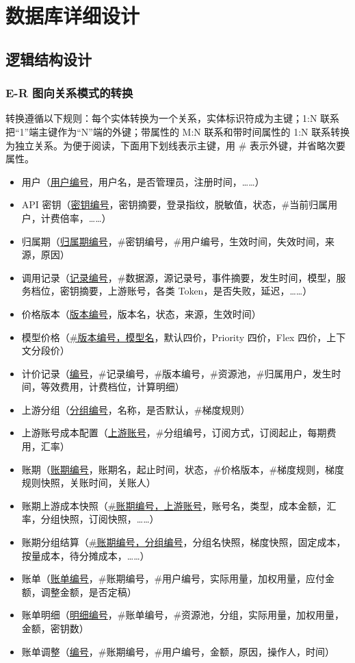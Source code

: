\section{数据库详细设计}

\subsection{逻辑结构设计}

\subsubsection{E-R 图向关系模式的转换}

转换遵循以下规则：每个实体转换为一个关系，实体标识符成为主键；1:N 联系把“1”端主键作为“N”端的外键；带属性的 M:N 联系和带时间属性的 1:N 联系转换为独立关系。为便于阅读，下面用下划线表示主键，用 \# 表示外键，并省略次要属性。

\begin{itemize}
  \item 用户（\underline{用户编号}，用户名，是否管理员，注册时间，……）
  \item API 密钥（\underline{密钥编号}，密钥摘要，登录指纹，脱敏值，状态，\#当前归属用户，计费倍率，……）
  \item 归属期（\underline{归属期编号}，\#密钥编号，\#用户编号，生效时间，失效时间，来源，原因）
  \item 调用记录（\underline{记录编号}，\#数据源，源记录号，事件摘要，发生时间，模型，服务档位，密钥摘要，上游账号，各类 Token，是否失败，延迟，……）
  \item 价格版本（\underline{版本编号}，版本名，状态，来源，生效时间）
  \item 模型价格（\underline{\#版本编号，模型名}，默认四价，Priority 四价，Flex 四价，上下文分段价）
  \item 计价记录（\underline{编号}，\#记录编号，\#版本编号，\#资源池，\#归属用户，发生时间，等效费用，计费档位，计算明细）
  \item 上游分组（\underline{分组编号}，名称，是否默认，\#梯度规则）
  \item 上游账号成本配置（\underline{上游账号}，\#分组编号，订阅方式，订阅起止，每期费用，汇率）
  \item 账期（\underline{账期编号}，账期名，起止时间，状态，\#价格版本，\#梯度规则，梯度规则快照，关账时间，关账人）
  \item 账期上游成本快照（\underline{\#账期编号，上游账号}，账号名，类型，成本金额，汇率，分组快照，订阅快照，……）
  \item 账期分组结算（\underline{\#账期编号，分组编号}，分组名快照，梯度快照，固定成本，按量成本，待分摊成本，……）
  \item 账单（\underline{账单编号}，\#账期编号，\#用户编号，实际用量，加权用量，应付金额，调整金额，是否定稿）
  \item 账单明细（\underline{明细编号}，\#账单编号，\#资源池，分组，实际用量，加权用量，金额，密钥数）
  \item 账单调整（\underline{编号}，\#账期编号，\#用户编号，金额，原因，操作人，时间）
\end{itemize}

